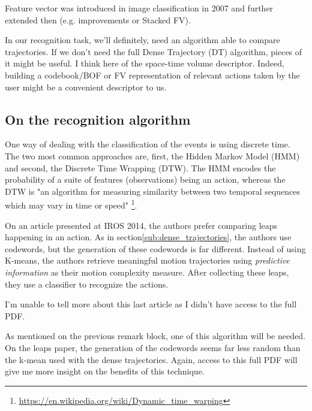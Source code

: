 \documentclass[a4paper]{article}
\begin{document}
			Feature vector was introduced in image classification in 2007\cite{perronnin2007fisher} and further extended then (e.g. improvements\cite{perronnin2010improving} or Stacked FV\cite{peng2014action}). 

			\begin{mdframed}[backgroundcolor = gray!30]
				In our recognition task, we'll definitely, need an algorithm able to compare trajectories. If we don't need the full Dense Trajectory (DT) algorithm, pieces of it might be useful. I think here of the space-time volume descriptor. Indeed, building a codebook/BOF or FV representation of relevant actions taken by the user might be a convenient descriptor to us.
			\end{mdframed}



		\subsection{On the recognition algorithm}
		\label{sub:reco_algo}
			One way of dealing with the classification of the events is using discrete time. The two most common approaches are, first, the Hidden Markov Model (HMM) and second, the Discrete Time Wrapping (DTW). The HMM encodes the probability of a suite of features (observations) being an action, whereas the DTW is "an algorithm for measuring similarity between two temporal sequences which may vary in time or speed" \footnote{\url{https://en.wikipedia.org/wiki/Dynamic_time_warping}}.

			On an article\cite{kwon2014complexity} presented at IROS 2014, the authors prefer comparing leaps happening in an action. As in section\ref{sub:dense_trajectories}, the authors use codewords, but the generation of these codewords is far different. Instead of using K-means, the authors retrieve meaningful motion trajectories using \textit{predictive information}\cite{bialek2001predictability} as their motion complexity measure. After collecting these leaps, they use a classifier to recognize the actions.

			I'm unable to tell more about this last article as I didn't have access to the full PDF.

			\begin{mdframed}[backgroundcolor = gray!30]
				As mentioned on the previous remark block, one of this algorithm will be needed. On the leaps paper, the generation of the codewords seems far less random than the k-mean used with the dense trajectories. Again, access to this full PDF will give me more insight on the benefits of this technique.
			\end{mdframed}
\end{document}
